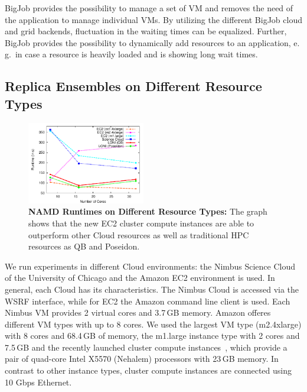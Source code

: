 \documentclass[conference,final]{IEEEtran}
\newcommand{\up}{\vspace*{-1em}}
\begin{document}
BigJob provides the possibility to manage a set of VM and removes the
need of the application to manage individual VMs. By utilizing
the different BigJob cloud and grid backends, fluctuation in the waiting 
times can be equalized. Further, BigJob provides the possibility
to dynamically add resources to an application, e.\,g.\ in case a
resource is heavily loaded and is showing long wait times.



\subsection{Replica Ensembles on Different Resource Types}
\up
\label{sec:performance_namd}
\begin{figure}[htbp]
    \centering
        \includegraphics[width=0.46\textwidth]{performance/namd_run}
    \caption{\textbf{NAMD Runtimes on Different Resource Types: } The
          graph shows that the new EC2 cluster compute instances are 
          able to outperform other Cloud resources as well as traditional
          HPC resources as QB and Poseidon.}
    \label{fig:performance_namd_run}
    \up
\end{figure}

We run experiments in different Cloud environments: the Nimbus Science 
Cloud of the University of Chicago and the Amazon EC2 environment is used. In general, each Cloud has 
its characteristics. The Nimbus Cloud is accessed via the WSRF
interface, while for EC2 the Amazon command line client is used. 
Each Nimbus VM provides 2 virtual cores and 3.7\,GB memory. 
Amazon offeres different VM types with up to 8 cores. We used the largest 
VM type (m2.4xlarge) with 8 cores and 68.4\,GB of memory,
the m1.large instance type with 2 cores and 7.5\,GB  and the recently launched
cluster compute instances~\cite{ec2-cc}, which provide a pair of quad-core Intel 
X5570 (Nehalem) processors with 23\,GB memory. In contrast to other instance types,
cluster compute instances are connected using 10 Gbps Ethernet.
\end{document}
